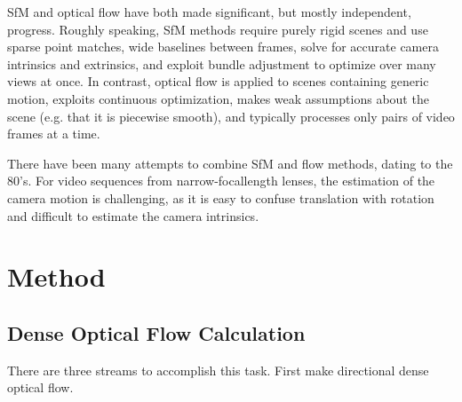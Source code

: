 \documentclass{article}
\begin{document}
SfM and optical flow have both made significant, but mostly independent, progress. Roughly speaking, SfM methods require purely rigid scenes and use sparse point matches, wide baselines between frames, solve for accurate camera intrinsics and extrinsics, and exploit bundle adjustment to optimize over many views at once. In contrast, optical flow is applied to scenes containing generic motion, exploits continuous optimization, makes weak assumptions about the scene (e.g. that it is piecewise smooth), and typically processes only pairs of video frames at a time.\par

There have been many attempts to combine SfM and flow methods, dating to the 80’s\cite{Heeger1992Subspace}. For video sequences from narrow-focallength lenses, the estimation of the camera motion is challenging, as it is easy to confuse translation with rotation and difficult to estimate the camera intrinsics\cite{Horn1988Direct}.






\section{Method}
\subsection{Dense Optical Flow Calculation}
There are three streams to accomplish this task. First make directional dense optical flow.






\end{document}
